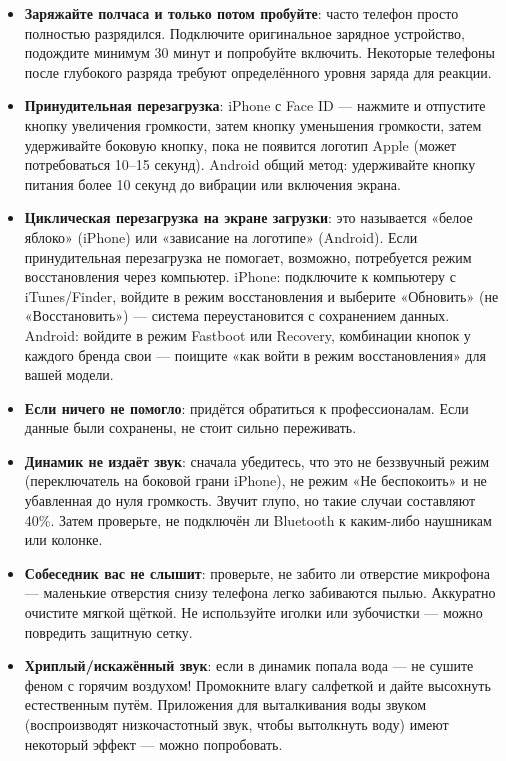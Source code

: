 \begin{itemize}
  \item \textbf{Заряжайте полчаса и только потом пробуйте}: часто телефон просто полностью разрядился. Подключите оригинальное зарядное устройство, подождите минимум 30 минут и попробуйте включить. Некоторые телефоны после глубокого разряда требуют определённого уровня заряда для реакции.
  \item \textbf{Принудительная перезагрузка}: iPhone с Face ID — нажмите и отпустите кнопку увеличения громкости, затем кнопку уменьшения громкости, затем удерживайте боковую кнопку, пока не появится логотип Apple (может потребоваться 10–15 секунд). Android общий метод: удерживайте кнопку питания более 10 секунд до вибрации или включения экрана.
  \item \textbf{Циклическая перезагрузка на экране загрузки}: это называется «белое яблоко» (iPhone) или «зависание на логотипе» (Android). Если принудительная перезагрузка не помогает, возможно, потребуется режим восстановления через компьютер. iPhone: подключите к компьютеру с iTunes/Finder, войдите в режим восстановления и выберите «Обновить» (не «Восстановить») — система переустановится с сохранением данных. Android: войдите в режим Fastboot или Recovery, комбинации кнопок у каждого бренда свои — поищите «как войти в режим восстановления» для вашей модели.
  \item \textbf{Если ничего не помогло}: придётся обратиться к профессионалам. Если данные были сохранены, не стоит сильно переживать.
\end{itemize}


\begin{itemize}
  \item \textbf{Динамик не издаёт звук}: сначала убедитесь, что это не беззвучный режим (переключатель на боковой грани iPhone), не режим «Не беспокоить» и не убавленная до нуля громкость. Звучит глупо, но такие случаи составляют 40\%. Затем проверьте, не подключён ли Bluetooth к каким-либо наушникам или колонке.
  \item \textbf{Собеседник вас не слышит}: проверьте, не забито ли отверстие микрофона — маленькие отверстия снизу телефона легко забиваются пылью. Аккуратно очистите мягкой щёткой. Не используйте иголки или зубочистки — можно повредить защитную сетку.
  \item \textbf{Хриплый/искажённый звук}: если в динамик попала вода — не сушите феном с горячим воздухом! Промокните влагу салфеткой и дайте высохнуть естественным путём. Приложения для выталкивания воды звуком (воспроизводят низкочастотный звук, чтобы вытолкнуть воду) имеют некоторый эффект — можно попробовать.
\end{itemize}

